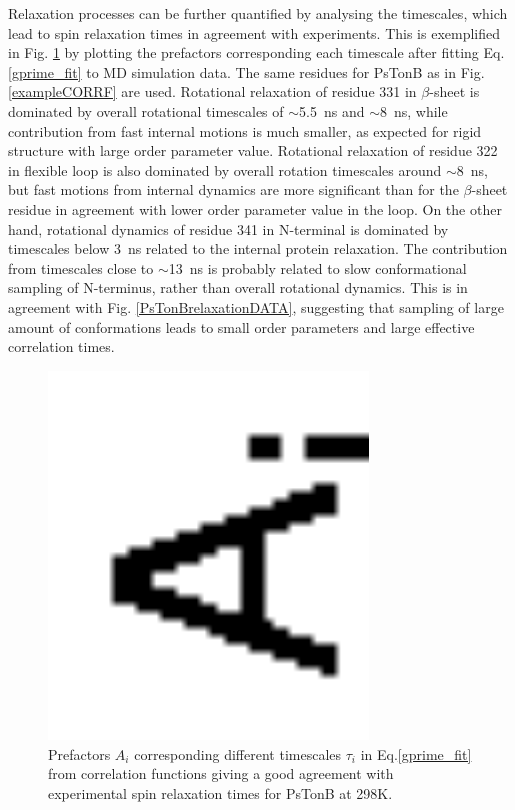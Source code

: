 \documentclass[pre,aps,floatfix,authordate1-4,twocolumn]{revtex4-1}
\begin{document}
Relaxation processes can be further quantified by analysing the timescales,
which lead to spin relaxation times in agreement with experiments.
This is exemplified in Fig. \ref{coeffsPLOT} by plotting the prefactors corresponding
each timescale after fitting Eq. \ref{gprime_fit} to MD simulation data. 
The same residues for PsTonB as in Fig. \ref{exampleCORRF} are used.
Rotational relaxation of residue 331 in $\beta$-sheet is dominated
by overall rotational timescales of $\sim$5.5~ns and $\sim$8~ns, while
contribution from fast internal motions is much smaller, as expected for rigid
structure with large order parameter value. Rotational
relaxation of residue 322 in flexible loop is also dominated by
overall rotation timescales around $\sim$8~ns, but fast motions
from internal dynamics are more significant than for the $\beta$-sheet
residue in agreement with lower order parameter value in the loop.
On the other hand, rotational dynamics of residue 341 in N-terminal is dominated by timescales
below 3~ns related to the internal protein relaxation. The contribution from timescales
close to $\sim$13~ns is probably related to slow conformational sampling of
N-terminus, rather than overall rotational dynamics. This is in agreement with
Fig. \ref{PsTonBrelaxationDATA}, suggesting that sampling of large amount of
conformations leads to small order parameters and large effective correlation times.
\begin{figure}[!h]
  \includegraphics[width=8.5cm]{../Figs/coeffsPLOT.eps}%
  \caption{Prefactors $A_i$ corresponding different timescales $\tau_i$ in Eq.\ref{gprime_fit}
    from correlation functions giving a good agreement with experimental spin relaxation times
    for PsTonB at 298K. 
    \label{coeffsPLOT}}%
\end{figure}
\end{document}

